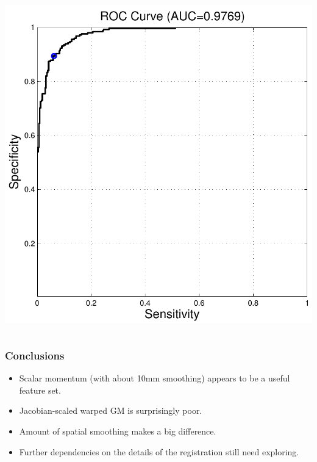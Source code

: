 \documentclass{beamer}
\begin{document}
\begin{frame}
\begin{columns}[c]
\includegraphics[width=1\textwidth]{sex_roc}
\end{columns}
\end{frame}


\begin{frame}
\frametitle{Conclusions}
\begin{itemize}
\item{Scalar momentum (with about 10mm smoothing) appears to be a useful feature set.}
\item{Jacobian-scaled warped GM is surprisingly poor.}
\item{Amount of spatial smoothing makes a big difference.}
\item{Further dependencies on the details of the registration still need exploring.}
\end{itemize}
\end{frame}
\end{document}
